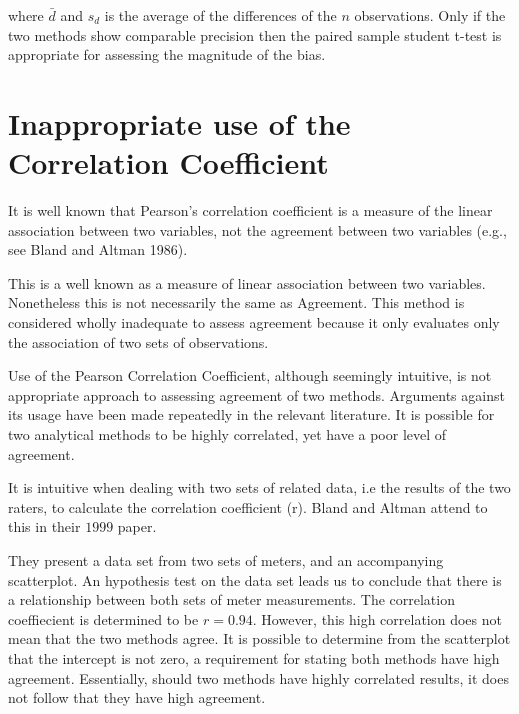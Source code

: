 \documentclass[12pt, a4paper]{report}
\theoremstyle{plain}
\theoremstyle{definition}
\theoremstyle{remark}
\begin{document}
			where $\bar{d}$ and $s_{d}$ is the average of the differences of
			the $n$ observations. Only if the two methods show comparable
			precision then the paired sample student t-test is appropriate for
			assessing the magnitude of the bias.

			

			
	\section{Inappropriate use of the Correlation Coefficient}

It is well known that Pearson's correlation coefficient is a measure of the linear association between two variables, not the agreement between two variables (e.g., see Bland and Altman 1986).


This is a well known as a measure of linear association between two	variables. Nonetheless this is not necessarily the same as Agreement. This method is considered wholly inadequate to assess
		agreement because it only evaluates only the association of two sets of observations.
		
	 Use of the Pearson
	 Correlation Coefficient, although seemingly intuitive, is not
	 appropriate approach to assessing agreement of two methods.
	 Arguments against its usage have been made repeatedly in the
	 relevant literature. It is possible for two analytical methods to
	 be highly correlated, yet have a poor level of agreement.
	 	
	It is intuitive when dealing with two sets of related data, i.e
	the results of the two raters, to calculate the correlation
	coefficient (r). Bland and Altman attend to this in their $1999$
	paper.
	
	They present a data set from two sets of meters, and an
	accompanying scatterplot. An hypothesis test on the data set leads
	us to conclude that there is a relationship between both sets of
	meter measurements. The correlation coeffiecient is determined to
	be $r =0.94 $. However, this high correlation does not mean that the
	two methods agree. It is possible to determine from the
	scatterplot that the intercept is not zero, a requirement for
	stating both methods have high agreement. Essentially, should two
	methods have highly correlated results, it does not follow that
	they have high agreement.
	
\end{document}
